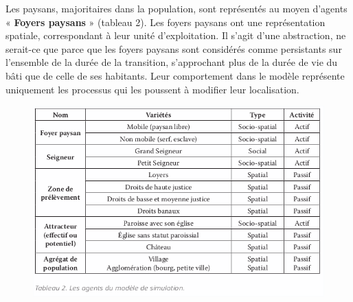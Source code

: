 \documentclass[12pt, a4paper, oneside]{book}
\begin{document}
	Les paysans, majoritaires dans la population, sont représentés au moyen d'agents « \textbf{Foyers paysans} » (tableau 2).
	Les foyers paysans ont une représentation spatiale, correspondant à leur unité d'exploitation.
	Il s'agit d'une abstraction, ne serait-ce que parce que les foyers paysans sont considérés comme persistants sur l'ensemble de la durée de la transition, s'approchant plus de la durée de vie du bâti que de celle de ses habitants.
	Leur comportement dans le modèle représente uniquement les processus qui les poussent à modifier leur localisation.
	
	\begin{figure}[H]
		\centering
		\includegraphics[width=1\linewidth]{src/Chapitre_TMD/Tab2.png}
	\end{figure}
	
\end{document}
